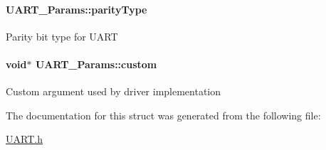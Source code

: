 \paragraph[{parity\+Type}]{ U\+A\+R\+T\+\_\+\+Params\+::parity\+Type}\label{struct_u_a_r_t___params_acaa90dc09cd820477c5bfaae152a2010}
Parity bit type for U\+A\+R\+T 
\paragraph[{custom}]{\setlength{\rightskip}{0pt plus 5cm}void$\ast$ U\+A\+R\+T\+\_\+\+Params\+::custom}\label{struct_u_a_r_t___params_ab4df0d3f6c1e1121f303d11271abb7a1}
Custom argument used by driver implementation 

The documentation for this struct was generated from the following file\+:\begin{DoxyCompactItemize}
\item 
\hyperlink{_u_a_r_t_8h}{U\+A\+R\+T.\+h}\end{DoxyCompactItemize}
